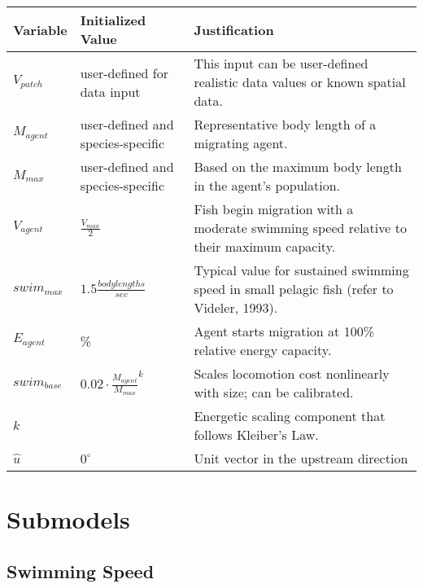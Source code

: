 \documentclass[
]{book}
\begin{document}
\begin{longtable}[]{@{}
  >{\centering\arraybackslash}p{}
  >{\centering\arraybackslash}p{}
  >{\centering\arraybackslash}p{}@{}}
\toprule\noalign{}
\begin{minipage}[b]{\linewidth}\centering
Variable
\end{minipage} & \begin{minipage}[b]{\linewidth}\centering
Initialized Value
\end{minipage} & \begin{minipage}[b]{\linewidth}\centering
Justification
\end{minipage} \\
\midrule\noalign{}
\endhead
\bottomrule\noalign{}
\endlastfoot
\(V_{patch}\) & user-defined for data input & This input can be user-defined realistic data values or known spatial data. \\
\(M_{agent}\) & user-defined and species-specific & Representative body length of a migrating agent. \\
\(M_{max}\) & user-defined and species-specific & Based on the maximum body length in the agent's population. \\
\(V_{agent}\) & \(\frac{V_{max}}{2}\) & Fish begin migration with a moderate swimming speed relative to their maximum capacity. \\
\(swim_{max}\) & \(1.5 \frac{body lengths}{sec}\) & Typical value for sustained swimming speed in small pelagic fish (refer to Videler, 1993). \\
\(E_{agent}\) & 100\% & Agent starts migration at 100\% relative energy capacity. \\
\(swim_{base}\) & \(0.02 \cdot \frac{M_{agent}}{M_{max}}^{k}\) & Scales locomotion cost nonlinearly with size; can be calibrated. \\
\(k\) & 0.75 & Energetic scaling component that follows Kleiber's Law. \\
\(\hat{u}\) & \(0^\circ\) & Unit vector in the upstream direction \\
\end{longtable}

\section{Submodels}\label{submodels-2}

\subsection{Swimming Speed}\label{swimming-speed}
\end{document}
